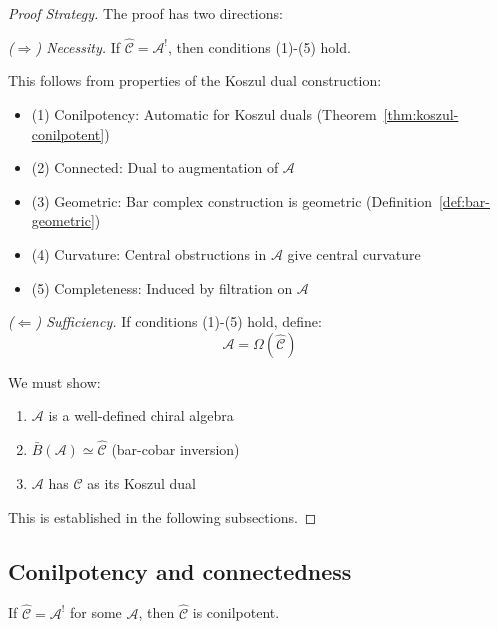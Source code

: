 \begin{proof}[Proof Strategy]
The proof has two directions:

\emph{($\Rightarrow$) Necessity.} If $\widehat{\mathcal{C}} = \mathcal{A}^!$, 
then conditions (1)-(5) hold.

This follows from properties of the Koszul dual construction:
\begin{itemize}
\item (1) Conilpotency: Automatic for Koszul duals (Theorem~\ref{thm:koszul-conilpotent})
\item (2) Connected: Dual to augmentation of $\mathcal{A}$
\item (3) Geometric: Bar complex construction is geometric (Definition~\ref{def:bar-geometric})
\item (4) Curvature: Central obstructions in $\mathcal{A}$ give central curvature
\item (5) Completeness: Induced by filtration on $\mathcal{A}$
\end{itemize}

\emph{($\Leftarrow$) Sufficiency.} If conditions (1)-(5) hold, define:
\[\mathcal{A} = \Omega(\widehat{\mathcal{C}})\]

We must show:
\begin{enumerate}
\item $\mathcal{A}$ is a well-defined chiral algebra
\item $\bar{B}(\mathcal{A}) \simeq \widehat{\mathcal{C}}$ (bar-cobar inversion)
\item $\mathcal{A}$ has $\widehat{\mathcal{C}}$ as its Koszul dual
\end{enumerate}

This is established in the following subsections.
\end{proof}

\subsection{Conilpotency and connectedness}

\begin{lemma}\label{lem:conilpotency-necessary}
If $\widehat{\mathcal{C}} = \mathcal{A}^!$ for some $\mathcal{A}$, then $\widehat{\mathcal{C}}$ 
is conilpotent.
\end{lemma}

